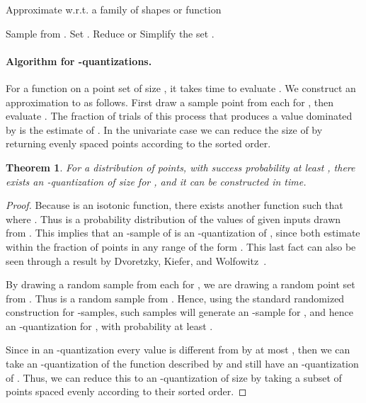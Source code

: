 \documentclass{journal}
\newtheorem {theorem}{Theorem}[section]
\begin{document}
\begin{algorithm}[h!!t]
\caption{Approximate  w.r.t. a family of shapes  or function 
\label{alg:rand-draw}}
\begin{algorithmic}[1]
    \STATE Sample  from .
  \ENDFOR
  \STATE Set .
\ENDFOR
\STATE Reduce or Simplify the set .
\end{algorithmic}
\end{algorithm}




\paragraph{Algorithm for -quantizations.}
\label{sec:algQ}
For a function  on a point set  of size , it takes  time to evaluate .
We construct an approximation to  
as follows.  First draw a sample point  from each  for , then evaluate .  The fraction of trials of this process that produces a value dominated by  is the estimate of .
In the univariate case we can reduce the size of  by returning  evenly spaced points according to the sorted order.

\begin{theorem}
For a distribution  of  points, with success probability at least ,
there exists an -quantization of size  for , and it can be constructed in  time.
\label{thm:eq-main}
\end{theorem}
\begin{proof}
Because  is an isotonic function, there exists another function  such that  where .  Thus  is a probability distribution of the values of  given inputs drawn from .
This implies that an -sample of  is an -quantization of , since both estimate within  the fraction of points in any range of the form .  This last fact can also be seen through a result by Dvoretzky, Kiefer, and Wolfowitz~\cite{DKW56}.  

By drawing a random sample  from each  for , we are drawing a random point set  from .  Thus  is a random sample from .  Hence, using the standard randomized construction for -samples,  such samples will generate an -sample for , and hence an -quantization for , with probability at least .

Since in an -quantization  every value  is different from  by at most , then we can take an -quantization of the function described by  and still have an -quantization of .
Thus, we can reduce this to an -quantization of size  by taking a subset of  points spaced evenly according to their sorted order.
\end{proof}
\end{document}
